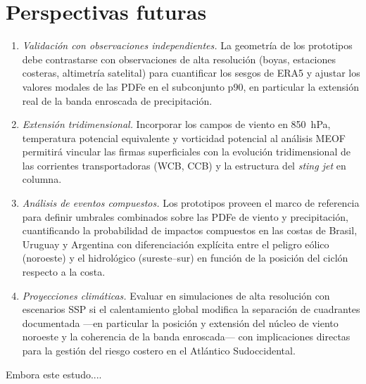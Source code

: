 \section{Perspectivas futuras}

\begin{enumerate}
    \item \textit{Validación con observaciones independientes.} La geometría de los prototipos debe contrastarse con observaciones de alta resolución (boyas, estaciones costeras, altimetría satelital) para cuantificar los sesgos de ERA5 y ajustar los valores modales de las PDFe en el subconjunto p90, en particular la extensión real de la banda enroscada de precipitación.

    \item \textit{Extensión tridimensional.} Incorporar los campos de viento en 850~hPa, temperatura potencial equivalente y vorticidad potencial al análisis MEOF permitirá vincular las firmas superficiales con la evolución tridimensional de las corrientes transportadoras (WCB, CCB) y la estructura del \textit{sting jet} en columna.

    \item \textit{Análisis de eventos compuestos.} Los prototipos proveen el marco de referencia para definir umbrales combinados sobre las PDFe de viento y precipitación, cuantificando la probabilidad de impactos compuestos en las costas de Brasil, Uruguay y Argentina con diferenciación explícita entre el peligro eólico (noroeste) y el hidrológico (sureste--sur) en función de la posición del ciclón respecto a la costa.

    \item \textit{Proyecciones climáticas.} Evaluar en simulaciones de alta resolución con escenarios SSP si el calentamiento global modifica la separación de cuadrantes documentada ---en particular la posición y extensión del núcleo de viento noroeste y la coherencia de la banda enroscada--- con implicaciones directas para la gestión del riesgo costero en el Atlántico Sudoccidental.
\end{enumerate}

Embora este estudo....
